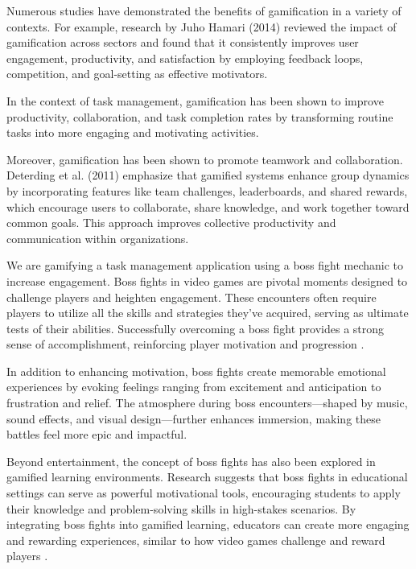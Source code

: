     Numerous studies have demonstrated the benefits of gamification in a variety of contexts. For example, research by Juho Hamari (2014) reviewed the impact of gamification across sectors and found that it consistently improves user engagement, productivity, and satisfaction by employing feedback loops, competition, and goal-setting as effective motivators. \cite{6758978}

    In the context of task management, gamification has been shown to improve productivity, collaboration, and task completion rates by transforming routine tasks into more engaging and motivating activities.

    Moreover, gamification has been shown to promote teamwork and collaboration. Deterding et al. (2011) emphasize that gamified systems enhance group dynamics by incorporating features like team challenges, leaderboards, and shared rewards, which encourage users to collaborate, share knowledge, and work together toward common goals. This approach improves collective productivity and communication within organizations. \cite{gamification:designElement}

    We are gamifying a task management application using a boss fight mechanic to increase engagement. Boss fights in video games are pivotal moments designed to challenge players and heighten engagement. These encounters often require players to utilize all the skills and strategies they've acquired, serving as ultimate tests of their abilities. Successfully overcoming a boss fight provides a strong sense of accomplishment, reinforcing player motivation and progression \cite{toxigon:bossFight}.

    In addition to enhancing motivation, boss fights create memorable emotional experiences by evoking feelings ranging from excitement and anticipation to frustration and relief. The atmosphere during boss encounters—shaped by music, sound effects, and visual design—further enhances immersion, making these battles feel more epic and impactful. \cite{toxigon:bossFight}

    Beyond entertainment, the concept of boss fights has also been explored in gamified learning environments. Research suggests that boss fights in educational settings can serve as powerful motivational tools, encouraging students to apply their knowledge and problem-solving skills in high-stakes scenarios. By integrating boss fights into gamified learning, educators can create more engaging and rewarding experiences, similar to how video games challenge and reward players \cite{gamification:Education}.

